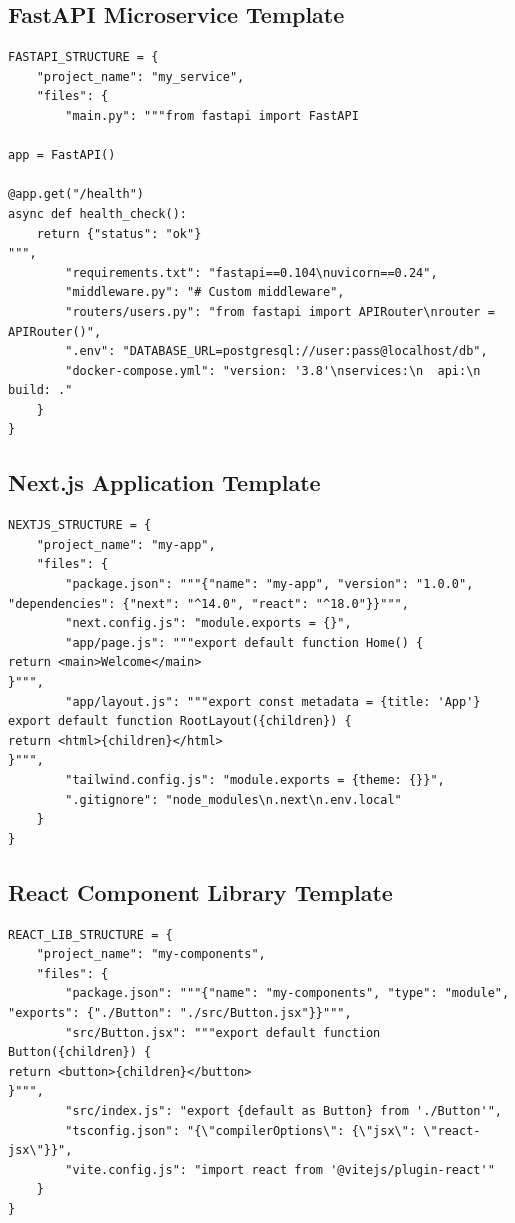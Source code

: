 \documentclass{report}
\begin{document}
\subsection{FastAPI Microservice Template}

\begin{lstlisting}
FASTAPI_STRUCTURE = {
    "project_name": "my_service",
    "files": {
        "main.py": """from fastapi import FastAPI

app = FastAPI()

@app.get("/health")
async def health_check():
    return {"status": "ok"}
""",
        "requirements.txt": "fastapi==0.104\nuvicorn==0.24",
        "middleware.py": "# Custom middleware",
        "routers/users.py": "from fastapi import APIRouter\nrouter = APIRouter()",
        ".env": "DATABASE_URL=postgresql://user:pass@localhost/db",
        "docker-compose.yml": "version: '3.8'\nservices:\n  api:\n    build: ."
    }
}
\end{lstlisting}

\subsection{Next.js Application Template}

\begin{lstlisting}
NEXTJS_STRUCTURE = {
    "project_name": "my-app",
    "files": {
        "package.json": """{"name": "my-app", "version": "1.0.0",
"dependencies": {"next": "^14.0", "react": "^18.0"}}""",
        "next.config.js": "module.exports = {}",
        "app/page.js": """export default function Home() {
return <main>Welcome</main>
}""",
        "app/layout.js": """export const metadata = {title: 'App'}
export default function RootLayout({children}) {
return <html>{children}</html>
}""",
        "tailwind.config.js": "module.exports = {theme: {}}",
        ".gitignore": "node_modules\n.next\n.env.local"
    }
}
\end{lstlisting}

\subsection{React Component Library Template}

\begin{lstlisting}
REACT_LIB_STRUCTURE = {
    "project_name": "my-components",
    "files": {
        "package.json": """{"name": "my-components", "type": "module",
"exports": {"./Button": "./src/Button.jsx"}}""",
        "src/Button.jsx": """export default function Button({children}) {
return <button>{children}</button>
}""",
        "src/index.js": "export {default as Button} from './Button'",
        "tsconfig.json": "{\"compilerOptions\": {\"jsx\": \"react-jsx\"}}",
        "vite.config.js": "import react from '@vitejs/plugin-react'"
    }
}
\end{lstlisting}
\end{document}
